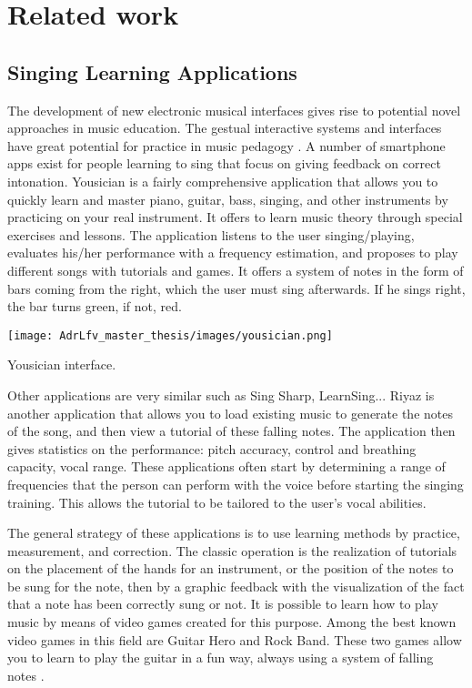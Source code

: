 \section{Related work}

\subsection{Singing Learning Applications}

The development of new electronic musical interfaces gives rise to potential novel approaches in music education. The gestual interactive systems and interfaces have great potential for practice in music pedagogy \cite{farrugia2015tunes}.
A number of smartphone apps exist for people learning to sing that focus on giving feedback on correct intonation.
Yousician is a fairly comprehensive application that allows you to quickly learn and master piano, guitar, bass, singing, and other instruments by practicing on your real instrument.
It offers to learn music theory through special exercises and lessons. The application listens to the user singing/playing, evaluates his/her performance with a frequency estimation, and proposes to play different songs with tutorials and games. It offers a system of notes in the form of bars coming from the right, which the user must sing afterwards. If he sings right, the bar turns green, if not, red.

\begin{marginfigure}
    \centering
    \texttt{[image: AdrLfv\_master\_thesis/images/yousician.png]}
    \caption{Yousician interface.}
    \label{fig:yousician}
\end{marginfigure}

Other applications are very similar such as Sing Sharp, LearnSing... Riyaz is another application that allows you to load existing music to generate the notes of the song, and then view a tutorial of these falling notes.
The application then gives statistics on the performance: pitch accuracy, control and breathing capacity, vocal range. These applications often start by determining a range of frequencies that the person can perform with the voice before starting the singing training. This allows the tutorial to be tailored to the user’s vocal abilities.

The general strategy of these applications is to use learning methods by practice, measurement, and correction. The classic operation is the realization of tutorials on the placement of the hands for an instrument, or the position of the notes to be sung for the note, then by a graphic feedback with the visualization of the fact that a note has been correctly sung or not.
It is possible to learn how to play music by means of video games created for this purpose. Among the best known video games in this field are Guitar Hero and Rock Band. These two games allow you to learn to play the guitar in a fun way, always using a system of falling notes \cite{farrugia2015tunes}.

